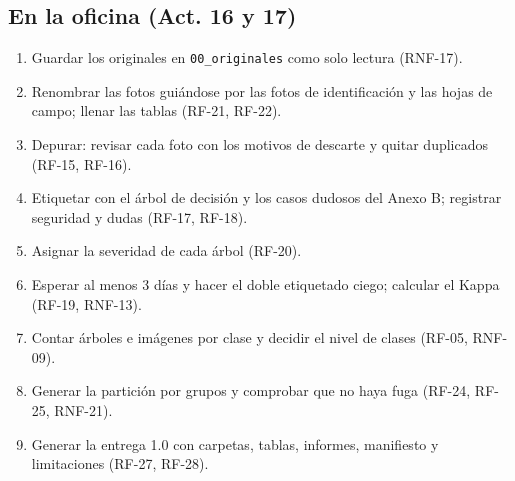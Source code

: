 \documentclass[11pt]{article}
\begin{document}
\subsection{En la oficina (Act. 16 y 17)}
\begin{enumerate}[leftmargin=1.2em,itemsep=2pt,topsep=2pt]
\item Guardar los originales en \nolinkurl{00_originales} como solo lectura (RNF-17).
\item Renombrar las fotos guiándose por las fotos de identificación y las hojas de campo; llenar las tablas (RF-21, RF-22).
\item Depurar: revisar cada foto con los motivos de descarte y quitar duplicados (RF-15, RF-16).
\item Etiquetar con el árbol de decisión y los casos dudosos del Anexo B; registrar seguridad y dudas (RF-17, RF-18).
\item Asignar la severidad de cada árbol (RF-20).
\item Esperar al menos 3 días y hacer el doble etiquetado ciego; calcular el Kappa (RF-19, RNF-13).
\item Contar árboles e imágenes por clase y decidir el nivel de clases (RF-05, RNF-09).
\item Generar la partición por grupos y comprobar que no haya fuga (RF-24, RF-25, RNF-21).
\item Generar la entrega 1.0 con carpetas, tablas, informes, manifiesto y limitaciones (RF-27, RF-28).
\end{enumerate}
\end{document}
